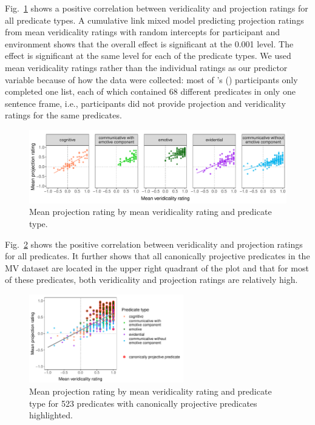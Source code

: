 \documentclass[11pt,fleqn]{article}
\newcommand{\figref}[1]{Fig.~\ref{#1}}
\newcommand{\6}{\mbox{$[\hspace*{-.6mm}[$}}
\newcommand{\9}{\mbox{$]\hspace*{-.6mm}]$}}
\newcommand{\citepos}[1]{\citeauthor{#1}'s (\citeyear{#1})}
\begin{document}
\figref{projverid} shows a positive correlation between veridicality and projection ratings for all predicate types. A cumulative link mixed model predicting projection ratings from mean veridicality ratings with random intercepts for participant and environment shows that the overall effect is significant at the 0.001 level. The effect is significant at the same level for each of the predicate types. We used mean veridicality ratings rather than the individual ratings as our predictor variable because of how the data were collected: most of \citepos{white-rawlins-nels2018} participants only completed one list, each of which contained 68 different predicates in only one sentence frame, i.e., participants did not provide projection and veridicality ratings for the same predicates.

\begin{figure}[H] 
	\centering
	\includegraphics[width=.9\textwidth]{projection-by-veridicality2-faceted}
	\caption{Mean projection rating by mean veridicality rating and predicate type.}
	\label{projverid}
\end{figure}

\figref{projveridfactives} shows the positive correlation between veridicality and projection ratings for all predicates. It further shows that all canonically projective predicates in the MV dataset are located in the upper right quadrant of the plot and that for most of these predicates, both veridicality and projection ratings are relatively high.

\begin{figure}[H] 
	\centering
	\includegraphics[width=0.6\textwidth]{projection-by-veridicality-with-factives2}
	\caption{Mean projection rating by mean veridicality rating and predicate type for 523 predicates with canonically projective predicates highlighted.}
	\label{projveridfactives}
\end{figure}
\end{document}
